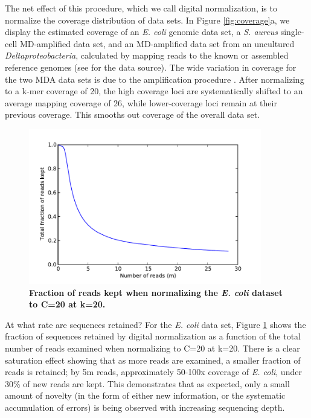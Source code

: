 The net effect of this procedure, which we call digital normalization, is to
normalize the coverage distribution of data sets.  In Figure
\ref{fig:coverage}a, we display the estimated coverage of an {\em E. coli}
genomic data set, a {\em S. aureus} single-cell MD-amplified data set, and an
MD-amplified data set from an uncultured {\em Deltaproteobacteria}, calculated
by mapping reads to the known or assembled reference genomes (see
\cite{pubmed21926975} for the data source).  The wide variation in coverage for
the two MDA data sets is due to the amplification procedure
\cite{pubmed17487184}.  After normalizing to a k-mer coverage of 20, the high
coverage loci are systematically shifted to an average mapping coverage of 26,
while lower-coverage loci remain at their previous coverage.  This smooths out
coverage of the overall data set.


\begin{figure}[!ht]
\centerline{\includegraphics[width=4in]{diginorm-accumulation.pdf}}
\caption{
{\bf Fraction of reads kept when normalizing the {\em E. coli} dataset to C=20 at k=20.}}
\label{fig:accumulate}
\end{figure}


At what rate are sequences retained?  For the {\em E. coli} data set, Figure
\ref{fig:accumulate} shows the fraction of sequences retained by digital
normalization as a function of the total number of reads examined when
normalizing to C=20 at k=20.  There is a clear saturation effect showing that
as more reads are examined, a smaller fraction of reads is retained; by 5m
reads, approximately 50-100x coverage of {\em E. coli}, under 30\% of new reads
are kept.  This demonstrates that as expected, only a small amount of novelty
(in the form of either new information, or the systematic accumulation of
errors) is being observed with increasing sequencing depth.

